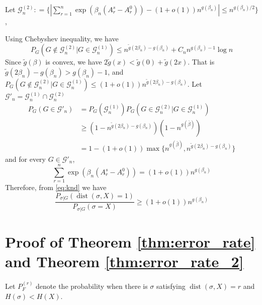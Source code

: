 \documentclass[journal]{IEEEtran}
\newcommand{\cG}{\mathcal{G}}
\newcommand{\1}{\mathbbm{1}}
\DeclareMathOperator{\dist}{dist}
\begin{document}
Let $\cG^{(2)}_n: = \{|\sum_{r=1}^n \exp(\beta_n (A_r^s - A_r^0)) - (1+o(1))n^{g(\beta_n)}  | \leq n^{g(\beta_n)/2} \}$,

Using Chebyshev inequality, we have
\begin{equation*}
P_G(G \not\in \cG^{(2)}_n \Big\vert  G \in \cG^{(1)}_n) \leq n^{\tilde{g}(2\beta_n) - g(\beta_n)} + C_n n^{g(\beta_n) - 1} \log n
\end{equation*}
Since $\tilde{g}(\beta)$ is convex,
we have $2\tilde{g}(x) < \tilde{g}(0) + \tilde{g}(2x)$. That is $\tilde{g}(2\beta_n) - g(\beta_n) > g(\beta_n) - 1$,
and $P_G(G \not\in \cG^{(2)}_n \Big\vert  G \in \cG^{(1)}_n) \leq (1+o(1))n^{\tilde{g}(2\beta_n) - g(\beta_n)}$.
Let $\cG'_n = \cG^{(1)}_n \cap \cG^{(2)}_n$
\begin{align*}
P_G(G \in \cG'_n) &= P_G(\cG^{(1)}_n) P_G(G \in \cG_n^{(2)} | G \in \cG_n^{(1)}) \\
& \geq (1-n^{\tilde{g}(2\beta_n) - g(\beta_n)})(1-n^{g(\bar{\beta})}) \\
&= 1-(1+o(1))\max\{n^{g(\bar{\beta})}, n^{\tilde{g}(2\beta_n) - g(\beta_n)} \}
\end{align*}
and for every $G\in\cG'_n$,
\begin{equation*}
\sum_{r=1}^n \exp(\beta_n (A_r^s - A_r^0)) = (1+o(1)) n^{g(\beta_n)}
\end{equation*}
Therefore, from \eqref{eq:knd} we have
\begin{equation*}
	\frac{P_{\sigma|G}(\dist(\sigma, X)=1)}
{P_{\sigma|G}(\sigma=X)} \geq (1+o(1)) n^{g(\beta_n)}
\end{equation*}
\section*{Proof of Theorem \ref{thm:error_rate} and Theorem \ref{thm:error_rate_2}}
Let $P_F^{(r)}$ denote the probability when there is $\sigma$ satisfying $\dist(\sigma, X) = r$ and $H(\sigma) < H(X)$.
\end{document}
